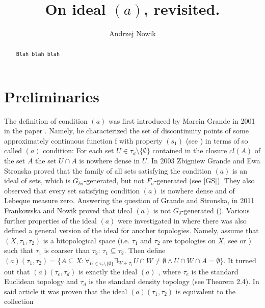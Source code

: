 \documentclass[12pt]{amsart}
\author{Andrzej Nowik}
\theoremstyle{plain}
\theoremstyle{definition}
\theoremstyle{remark}
\newcommand{\cl}{\mathit{cl}}
\newcommand{\dummy}{{\tt Blah blah blah}}
\newcommand{\aideal}{\mathit{(a)}}
\newcommand{\topWithoutEmptyset}[1]{#1\setminus\lbrace\emptyset\rbrace}
\begin{document}
\title[
On ideal $(a)$, revisited.
]{
On ideal $(a)$, revisited.
}

\begin{abstract}
\dummy
\end{abstract}

\maketitle

\section{Preliminaries}
\label{section:preliminaries}
The definition of condition $(a)$ was first introduced by Marcin Grande in 2001 in the paper
\cite{MarcinGrande}. Namely, he characterized the set of discontinuity points of some approximately continuous function f with property
$(s_1)$ (see \cite{MarcinGrande}) in terms of so called $(a)$ condition:
For each set $U\in\tau_d\setminus\lbrace\emptyset\rbrace$ contained in the closure $\cl(A)$ of the set $A$ the
set $U \cap A$ is nowhere dense in $U$.
In 2003 Zbigniew Grande and Ewa Stronska proved that the family of all sets satisfying
the condition $(a)$ is an ideal of sets, which is $G_{\delta\sigma}$-generated, but not 
$F_{\sigma}$-generated 
(see [GS]). They also observed that every set satisfying condition $(a)$ is nowhere dense
and of Lebeque measure zero. Answering the question of Grande and Stronska,
in 2011 Frankowska and Nowik proved that ideal $(a)$ is not $G_{\delta}$-generated (\cite{FN2}).
Various further properties of the ideal $(a)$ were investigated in \cite{N}
where there was also defined a general version of the ideal for another
topologies. Namely, assume
that $(X, \tau_1,\tau_2)$ is a bitopological space 
(i.e. $\tau_1$ and $\tau_2$ are topologies on $X$, 
see \cite{D} or )
such that $\tau_1$ is coarser than $\tau_2$:
$\tau_1 \subseteq \tau_2$. Then 
define $\aideal(\tau_1, \tau_2) = \{ A \subseteq X \colon
\forall_{U \in \topWithoutEmptyset{\tau_2}}
\exists_{W \in \tau_1} U \cap W \not= \emptyset \wedge
U \cap W \cap A = \emptyset\}$.
It turned out that $\aideal(\tau_e, \tau_d)$ is exactly the ideal $(a)$
, where $\tau_e$ is the standard Euclidean topology and 
$\tau_d$ is the standard density topology (see \cite{N} Theorem 2.4).
In said article it was proven that the ideal $\aideal(\tau_1, \tau_2)$
is equivalent to the collection 
\end{document}
